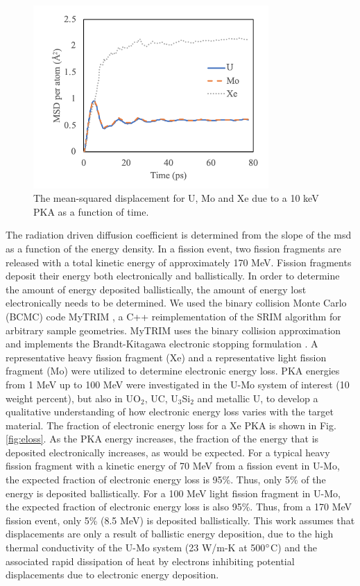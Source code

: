 \documentclass[review]{elsarticle}
\begin{document}
\begin{figure}[h]
 \centering
 \includegraphics[width=0.8\textwidth]{msd_vs_time.png} 
 \caption{ The mean-squared displacement for U, Mo and Xe due to a 10 keV PKA as a function of time.}
 \label{fig:msd}
\end{figure}

The radiation driven diffusion coefficient is determined from the slope of the msd as a function of the energy density. In a fission event, two fission fragments are released with a total kinetic energy of approximately 170 MeV. Fission fragments deposit their energy both electronically and ballistically. In order to determine the amount of energy deposited ballistically, the amount of energy lost electronically needs to be determined. We used the binary collision Monte Carlo (BCMC) code MyTRIM \cite{myTRIM}, a C++ reimplementation of the SRIM algorithm for arbitrary sample geometries. MyTRIM uses the binary collision approximation and implements the Brandt-Kitagawa electronic stopping formulation \cite{brandt1982}. A representative heavy fission fragment (Xe) and a representative light fission fragment (Mo) were utilized to determine electronic energy loss. PKA energies from 1 MeV up to 100 MeV were investigated in the U-Mo system of interest (10 weight percent), but also in UO$_2$, UC, U$_3$Si$_2$ and metallic U, to develop a qualitative understanding of how electronic energy loss varies with the target material. The fraction of electronic energy loss for a Xe PKA is shown in Fig. \ref{fig:eloss}. As the PKA energy increases, the fraction of the energy that is deposited electronically increases, as would be expected. For a typical heavy fission fragment with a kinetic energy of 70 MeV from a fission event in U-Mo, the expected fraction of electronic energy loss is 95\%. Thus, only 5\% of the energy is deposited ballistically. For a 100 MeV light fission fragment in U-Mo, the expected fraction of electronic energy loss is also 95\%. Thus, from a 170 MeV fission event, only 5\% (8.5 MeV) is deposited ballistically. This work assumes that displacements are only a result of ballistic energy deposition, due to the high thermal conductivity of the U-Mo system (23 W/m-K at 500$\degree$C) \cite{umo_handbook} and the associated rapid dissipation of heat by electrons inhibiting potential displacements due to electronic energy deposition. 
\end{document}
